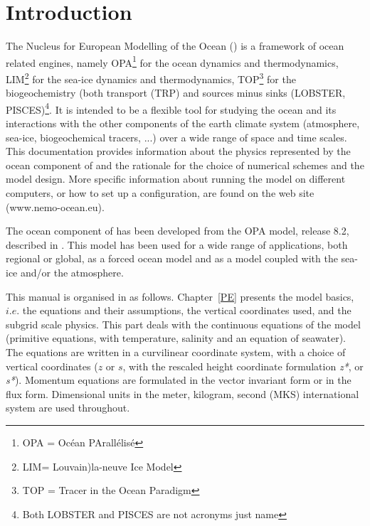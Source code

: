 \documentclass[NEMO_book]{subfiles}
\begin{document}

\chapter{Introduction}

The Nucleus for European Modelling of the Ocean (\NEMO) is a framework of ocean 
related engines, namely OPA\footnote{OPA = Oc\'{e}an PArall\'{e}lis\'{e}} for the 
ocean dynamics and thermodynamics, LIM\footnote{LIM= Louvain)la-neuve Ice 
Model} for the sea-ice dynamics and thermodynamics, TOP\footnote{TOP = Tracer 
in the Ocean Paradigm} for the biogeochemistry (both transport (TRP) and sources 
minus sinks (LOBSTER, PISCES)\footnote{Both LOBSTER and PISCES are not 
acronyms just name}. It is intended to be a flexible tool for studying the ocean and 
its interactions with the other components of the earth climate system (atmosphere, 
sea-ice, biogeochemical tracers, ...) over a wide range of space and time scales. 
This documentation provides information about the physics represented by the ocean 
component of \NEMO and the rationale for the choice of numerical schemes and 
the model design. More specific information about running the model on different 
computers, or how to set up a configuration, are found on the \NEMO web site 
(www.nemo-ocean.eu). 

The ocean component of \NEMO has been developed from the OPA model, 
release 8.2, described in \citet{Madec1998}. This model has been used for a wide 
range of applications, both regional or global, as a forced ocean model and as a 
model coupled with the sea-ice and/or the atmosphere.  

This manual is organised in as follows. Chapter~\ref{PE} presents the model basics, 
$i.e.$ the equations and their assumptions, the vertical coordinates used, and the 
subgrid scale physics. This part deals with the continuous equations of the model 
(primitive equations, with temperature, salinity and an equation of seawater). 
The equations are written in a curvilinear coordinate system, with a choice of vertical 
coordinates ($z$ or $s$, with the rescaled height coordinate formulation \textit{z*}, or  
\textit{s*}). Momentum equations are formulated in the vector invariant form or in the 
flux form. Dimensional units in the meter, kilogram, second (MKS) international system 
are used throughout.
\end{document}
